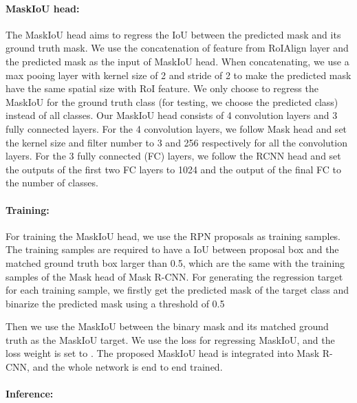 \documentclass[10pt,twocolumn,letterpaper]{article}
\begin{document}
    \paragraph{MaskIoU head:} The MaskIoU head aims to regress the IoU between the predicted mask and its ground truth mask. We use the concatenation of feature from RoIAlign layer and the predicted mask as the input of MaskIoU head. When concatenating, we use a max pooing layer with kernel size of 2 and stride of 2 to make the predicted mask have the same spatial size with RoI feature. We only choose to regress the MaskIoU for the ground truth class (for testing, we choose the predicted class) instead of all classes. Our MaskIoU head consists of 4 convolution layers and 3 fully connected layers. For the 4 convolution layers, we follow Mask head and set the kernel size and filter number to 3 and 256 respectively for all the convolution layers. For the 3 fully connected (FC) layers, we follow the RCNN head and set the outputs of the first two FC layers to 1024 and the output of the final FC to the number of classes.
    

 
          
    





\vspace{-2mm}
    \paragraph{Training:}

    For training the MaskIoU head, we use the RPN proposals as training samples. The training samples are required to have a IoU between proposal box and the matched ground truth box larger than 0.5, which are the same with the training samples of the Mask head of Mask R-CNN. For generating the regression target for each training sample, we firstly get the predicted mask of the target class and binarize the predicted mask using a threshold of 0.5 


 



    Then we use the MaskIoU between the binary mask and its matched ground truth as the MaskIoU target.
    We use the  loss for regressing MaskIoU, and the loss weight is set to . The proposed MaskIoU head is integrated into Mask R-CNN, and the whole network is end to end trained.

\vspace{-2mm}
    \paragraph{Inference:}
    
\end{document}
